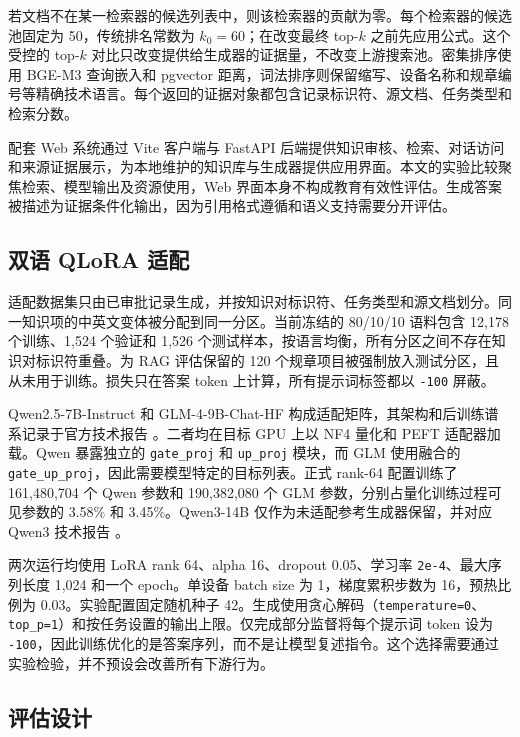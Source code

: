 若文档不在某一检索器的候选列表中，则该检索器的贡献为零。每个检索器的候选池固定为 50，传统排名常数为 $k_0=60$；在改变最终 top-$k$ 之前先应用公式。这个受控的 top-$k$ 对比只改变提供给生成器的证据量，不改变上游搜索池。密集排序使用 BGE-M3 查询嵌入和 pgvector 距离，词法排序则保留缩写、设备名称和规章编号等精确技术语言。每个返回的证据对象都包含记录标识符、源文档、任务类型和检索分数。

配套 Web 系统通过 Vite 客户端与 FastAPI 后端提供知识审核、检索、对话访问和来源证据展示，为本地维护的知识库与生成器提供应用界面。本文的实验比较聚焦检索、模型输出及资源使用，Web 界面本身不构成教育有效性评估。生成答案被描述为证据条件化输出，因为引用格式遵循和语义支持需要分开评估。

\subsection{双语 QLoRA 适配}

适配数据集只由已审批记录生成，并按知识对标识符、任务类型和源文档划分。同一知识项的中英文变体被分配到同一分区。当前冻结的 80/10/10 语料包含 12,178 个训练、1,524 个验证和 1,526 个测试样本，按语言均衡，所有分区之间不存在知识对标识符重叠。为 RAG 评估保留的 120 个规章项目被强制放入测试分区，且从未用于训练。损失只在答案 token 上计算，所有提示词标签都以 \texttt{-100} 屏蔽。

Qwen2.5-7B-Instruct 和 GLM-4-9B-Chat-HF 构成适配矩阵，其架构和后训练谱系记录于官方技术报告 \citep{qwen2024technical,glm2024chatglm}。二者均在目标 GPU 上以 NF4 量化和 PEFT 适配器加载。Qwen 暴露独立的 \texttt{gate\_proj} 和 \texttt{up\_proj} 模块，而 GLM 使用融合的 \texttt{gate\_up\_proj}，因此需要模型特定的目标列表。正式 rank-64 配置训练了 161,480,704 个 Qwen 参数和 190,382,080 个 GLM 参数，分别占量化训练过程可见参数的 3.58\% 和 3.45\%。Qwen3-14B 仅作为未适配参考生成器保留，并对应 Qwen3 技术报告 \citep{qwen2025technical}。

两次运行均使用 LoRA rank 64、alpha 16、dropout 0.05、学习率 \texttt{2e-4}、最大序列长度 1,024 和一个 epoch。单设备 batch size 为 1，梯度累积步数为 16，预热比例为 0.03。实验配置固定随机种子 42。生成使用贪心解码（\texttt{temperature=0}、\texttt{top\_p=1}）和按任务设置的输出上限。仅完成部分监督将每个提示词 token 设为 \texttt{-100}，因此训练优化的是答案序列，而不是让模型复述指令。这个选择需要通过实验检验，并不预设会改善所有下游行为。

\subsection{评估设计}

